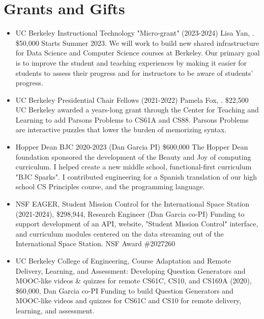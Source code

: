 \section{Grants and Gifts}
\vspace{6pt}

\begin{itemize}

  \setlength\itemsep{1em}

    \item{UC Berkeley Instructional Technology "Micro-grant" (2023-2024) Lisa Yan, \firstme. \$50,000
    \newline
    Starts Summer 2023. We will work to build new shared infrastructure for Data Science and Computer Science courses at Berkeley. Our primary goal is to improve the student and teaching experiences by making it easier for students to assess their progress and for instructors to be aware of students' progress.
    }
    
    \item{UC Berkeley Presidential Chair Fellows (2021-2022) Pamela Fox, \firstme. \$22,500
    \newline
    UC Berkeley awarded a years-long grant through the Center for Teaching and Learning to add Parsons Problems to CS61A and CS88. Parsons Problems are interactive puzzles that lower the burden of memorizing syntax.
    }
    
    \item{Hopper Dean BJC 2020-2023 (Dan Garcia PI) \$600,000
    \newline
    The Hopper Dean foundation sponsored the development of the Beauty and Joy of computing curriculum. I helped create a new middle school, functional-first curriculum "BJC Sparks". I contributed engineering for a Spanish translation of our high school CS Principles course, and the \snap programming language.}
    
    \item{NSF EAGER, Student Mission Control for the International Space Station (2021-2024),
    \$298,944, Research Engineer (Dan Garcia co-PI)
    Funding to support development of an API, website, "Student Mission Control" interface, and curriculum modules centered on the data streaming out of the International Space Station. NSF Award \#2027260}

    \item{UC Berkeley College of Engineering, Course Adaptation and Remote Delivery, Learning, and Assessment: Developing Question Generators and MOOC-like videos \& quizzes for remote CS61C, CS10, and CS169A (2020), \$60,000, Dan Garcia co-PI
    Funding to build Question Generators and MOOC-like videos and quizzes for CS61C and CS10 for remote delivery, learning, and assessment.
    }
    

\end{itemize}
